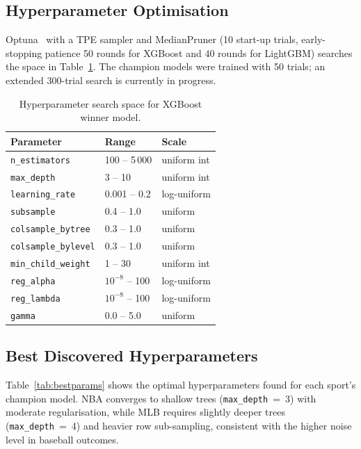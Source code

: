 \documentclass[conference]{IEEEtran}
\begin{document}
\subsection{Hyperparameter Optimisation}

Optuna~\cite{akiba2019} with a TPE sampler and MedianPruner
(10 start-up trials, early-stopping patience 50 rounds for XGBoost and
40 rounds for LightGBM) searches the space in Table~\ref{tab:hpspace}.
The champion models were trained with 50 trials; an extended 300-trial
search is currently in progress.

\begin{table}[t]
\centering
\caption{Hyperparameter search space for XGBoost winner model.}
\label{tab:hpspace}
\small
\begin{tabular}{lll}
\toprule
\textbf{Parameter} & \textbf{Range} & \textbf{Scale} \\
\midrule
\texttt{n\_estimators}       & 100 -- 5\,000 & uniform int \\
\texttt{max\_depth}          & 3 -- 10       & uniform int \\
\texttt{learning\_rate}      & 0.001 -- 0.2  & log-uniform \\
\texttt{subsample}           & 0.4 -- 1.0    & uniform \\
\texttt{colsample\_bytree}   & 0.3 -- 1.0    & uniform \\
\texttt{colsample\_bylevel}  & 0.3 -- 1.0    & uniform \\
\texttt{min\_child\_weight}  & 1 -- 30       & uniform int \\
\texttt{reg\_alpha}          & $10^{-8}$ -- 100  & log-uniform \\
\texttt{reg\_lambda}         & $10^{-8}$ -- 100  & log-uniform \\
\texttt{gamma}               & 0.0 -- 5.0    & uniform \\
\bottomrule
\end{tabular}
\end{table}

\subsection{Best Discovered Hyperparameters}

Table~\ref{tab:bestparams} shows the optimal hyperparameters found for
each sport's champion model.  NBA converges to shallow trees
(\texttt{max\_depth}~=~3) with moderate regularisation, while MLB
requires slightly deeper trees (\texttt{max\_depth}~=~4) and heavier
row sub-sampling, consistent with the higher noise level in baseball
outcomes.
\end{document}
